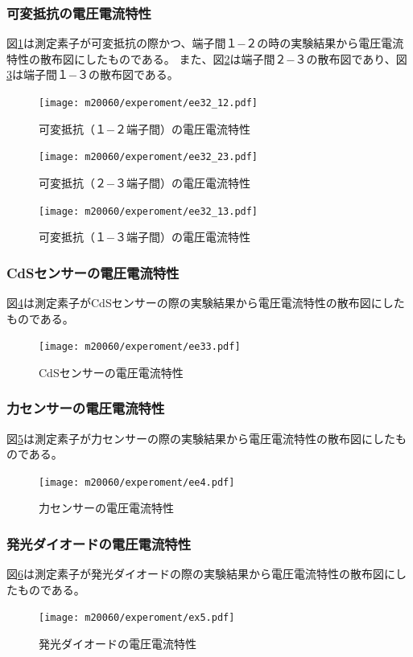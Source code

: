 \documentclass[11pt,dvipdfmx]{jarticle}
\begin{document}
	\subsubsection{可変抵抗の電圧電流特性}
	図\ref{fig:graph2-12}は測定素子が可変抵抗の際かつ、端子間１−２の時の実験結果から電圧電流特性の散布図にしたものである。
	また、図\ref{fig:graph2-23}は端子間２−３の散布図であり、図\ref{fig:graph2-13}は端子間１−３の散布図である。
		\begin{figure}[H]
			\centering
			\texttt{[image: m20060/experoment/ee32\_12.pdf]}
			\caption{可変抵抗（１−２端子間）の電圧電流特性}
			\label{fig:graph2-12}
		\end{figure}
		\begin{figure}[H]
			\centering
			\texttt{[image: m20060/experoment/ee32\_23.pdf]}
			\caption{可変抵抗（２−３端子間）の電圧電流特性}
			\label{fig:graph2-23}
		\end{figure}
		\begin{figure}[H]
			\centering
			\texttt{[image: m20060/experoment/ee32\_13.pdf]}
			\caption{可変抵抗（１−３端子間）の電圧電流特性}
			\label{fig:graph2-13}
		\end{figure}

	\subsubsection{CdSセンサーの電圧電流特性}
	図\ref{fig:graph3}は測定素子がCdSセンサーの際の実験結果から電圧電流特性の散布図にしたものである。
	\begin{figure}[H]
		\centering
		\texttt{[image: m20060/experoment/ee33.pdf]}
		\caption{CdSセンサーの電圧電流特性}
		\label{fig:graph3}
	\end{figure}
	\subsubsection{力センサーの電圧電流特性}
	図\ref{fig:graph4}は測定素子が力センサーの際の実験結果から電圧電流特性の散布図にしたものである。
	\begin{figure}[H]
		\centering
		\texttt{[image: m20060/experoment/ee4.pdf]}
		\caption{力センサーの電圧電流特性}
		\label{fig:graph4}
	\end{figure}
	\subsubsection{発光ダイオードの電圧電流特性}
	図\ref{fig:graph5}は測定素子が発光ダイオードの際の実験結果から電圧電流特性の散布図にしたものである。
	\begin{figure}[H]
		\centering
		\texttt{[image: m20060/experoment/ex5.pdf]}
		\caption{発光ダイオードの電圧電流特性}
		\label{fig:graph5}
	\end{figure}
\end{document}
